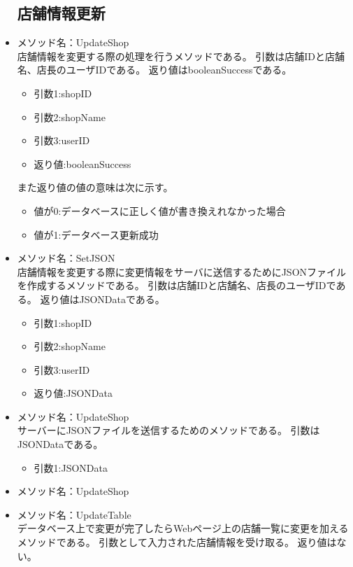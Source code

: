 \documentclass[a4j]{jarticle}
\begin{document}
\begin{itemize}
\subsection{店舗情報更新}



\item メソッド名：UpdateShop\\

店舗情報を変更する際の処理を行うメソッドである。
引数は店舗IDと店舗名、店長のユーザIDである。
返り値はbooleanSuccessである。
	\begin{itemize}
		\item 引数1:shopID
		\item 引数2:shopName
		\item 引数3:userID
		\item 返り値:booleanSuccess
	\end{itemize}
また返り値の値の意味は次に示す。
	\begin{itemize}
		\item 値が0:データベースに正しく値が書き換えれなかった場合
		\item 値が1:データベース更新成功
	\end{itemize}

\item メソッド名：SetJSON\\

店舗情報を変更する際に変更情報をサーバに送信するためにJSONファイルを作成するメソッドである。
引数は店舗IDと店舗名、店長のユーザIDである。
返り値はJSONDataである。
	\begin{itemize}
		\item 引数1:shopID
		\item 引数2:shopName
		\item 引数3:userID
		\item 返り値:JSONData
	\end{itemize}
\item メソッド名：UpdateShop\\

サーバーにJSONファイルを送信するためのメソッドである。
引数はJSONDataである。
	\begin{itemize}
		\item 引数1:JSONData
	\end{itemize}
\item メソッド名：UpdateShop\\
\item メソッド名：UpdateTable\\
データベース上で変更が完了したらWebページ上の店舗一覧に変更を加えるメソッドである。
引数として入力された店舗情報を受け取る。
返り値はない。


\end{itemize}
\end{document}
